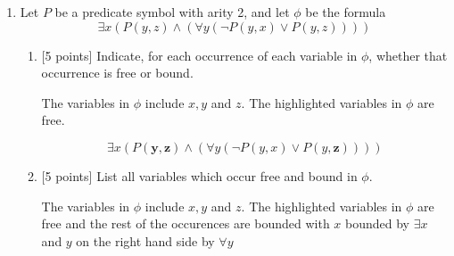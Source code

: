 \documentclass{article}
\begin{document}
\begin{enumerate}
\item Let $P$ be a predicate symbol with arity 2, and let $\phi$ be
  the formula
  \begin{displaymath}
    \exists x (P(y,z) \land (\forall y (\neg P(y,x) \lor P(y,z))))
  \end{displaymath}
  \begin{enumerate}
  \item {[5 points]} Indicate, for each occurrence of each variable in
    $\phi$, whether that occurrence is free or bound.
    \begin{answer}
    	The variables in $\phi$ include $x, y$ and $z$.
    	The highlighted variables in $\phi$ are free.
    	
    	\begin{displaymath}
    		\exists x (P(\textbf{y},\textbf{z}) \land (\forall y (\neg P(y,x) \lor
    		P(y,\textbf{z}))))
  		\end{displaymath}
  		
    \end{answer}
  \item {[5 points]} List all variables which occur free and bound in
    $\phi$.
    \begin{answer}
    	The variables in $\phi$ include $x, y$ and $z$.
    	The highlighted variables in $\phi$ are free and the rest of the occurences
    	are bounded with $x$ bounded by $\exists x$ and $y$ on the right hand side
    	by $\forall y$
    	

\end{answer}
\end{enumerate}
\end{enumerate}
\end{document}

